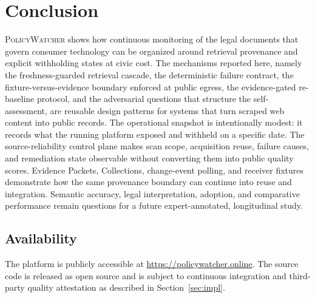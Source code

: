 \documentclass[11pt]{article}
\newcommand{\pw}{\textsc{PolicyWatcher}}
\begin{document}
\section{Conclusion}
\label{sec:conclusion}

\pw{} shows how continuous monitoring of the legal documents that govern consumer
technology can be organized around retrieval provenance and explicit withholding
states at civic cost. The mechanisms reported here, namely the freshness-guarded
retrieval cascade, the deterministic failure contract, the fixture-versus-evidence
boundary enforced at public egress, the evidence-gated re-baseline protocol, and
the adversarial questions that structure the self-assessment, are reusable design
patterns for systems that turn scraped web content into public records. The
operational snapshot is intentionally modest: it records what the running
platform exposed and withheld on a specific date. The source-reliability control
plane makes scan scope, acquisition reuse, failure causes, and remediation state
observable without converting them into public quality scores. Evidence Packets,
Collections, change-event polling, and receiver fixtures demonstrate how the
same provenance boundary can continue into reuse and integration. Semantic
accuracy, legal interpretation, adoption, and comparative performance remain
questions for a future expert-annotated, longitudinal study.

\subsection*{Availability}
The platform is publicly accessible at \url{https://policywatcher.online}.
The source code is released as open source and is subject to continuous
integration and third-party quality attestation as described in
Section~\ref{sec:impl}.
\end{document}
